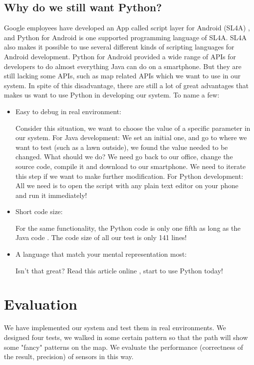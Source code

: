 \documentclass[journal]{IEEEtran}
\begin{document}
\subsection{Why do we still want Python?}
Google employees have developed an App called script layer for Android (SL4A) \cite{SL4A}, and Python for Android is one supported programming language of SL4A.
SL4A also makes it possible to use several different kinds of scripting languages for Android development.
Python for Android provided a wide range of APIs for developers to do almost everything Java can do on a smartphone.
But they are still lacking some APIs, such as map related APIs which we want to use in our system.
In spite of this disadvantage, there are still a lot of great advantages that makes us want to use Python in developing our system.
To name a few:
\begin{itemize}
	\item Easy to debug in real environment: 

		Consider this situation, we want to choose the value of a specific parameter in our system.
		For Java development:
		We set an initial one, and go to where we want to test (such as a lawn outside), we found the value needed to be changed.
		What should we do?
		We need go back to our office, change the source code, compile it and download to our smartphone.
		We need to iterate this step if we want to make further modification.
		For Python development:
		All we need is to open the script with any plain text editor on your phone and run it immediately!
	\item Short code size: 
		
		For the same functionality, the Python code is only one fifth as long as the Java code \cite{PvJ}.
		The code size of all our test is only 141 lines!
	\item A language that match your mental representation most: 
		
		Isn't that great? Read this article online \cite{Why Python}, start to use Python today!
\end{itemize}
\section{Evaluation}
We have implemented our system and test them in real environments. 
We designed four tests, we walked in some certain pattern so that the path will show some "fancy" patterns on the map. 
We evaluate the performance (correctness of the result, precision) of sensors in this way.
\end{document}
